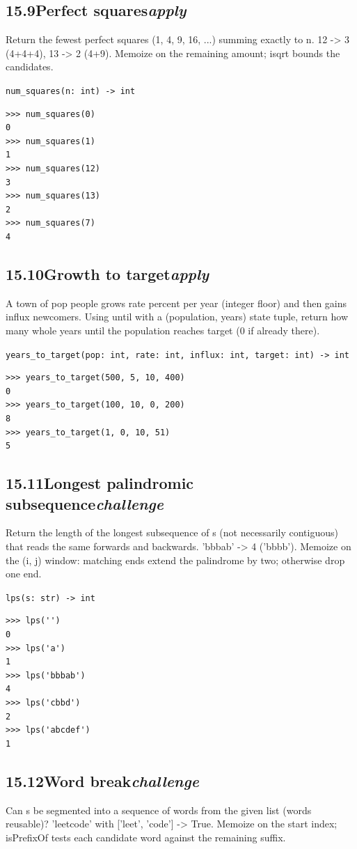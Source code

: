 \documentclass[10pt,letterpaper]{book}
\begin{document}
\subsection*{15.9\quad Perfect squares\hfill\textnormal{\textit{apply}}}
Return the fewest perfect squares (1, 4, 9, 16, ...) summing exactly to n. 12 -> 3 (4+4+4), 13 -> 2 (4+9). Memoize on the remaining amount; isqrt bounds the candidates.

\noindent\texttt{num\_squares(n: int) -> int}
\begin{lstlisting}[style=ex]
>>> num_squares(0)
0
>>> num_squares(1)
1
>>> num_squares(12)
3
>>> num_squares(13)
2
>>> num_squares(7)
4
\end{lstlisting}
\subsection*{15.10\quad Growth to target\hfill\textnormal{\textit{apply}}}
A town of pop people grows rate percent per year (integer floor) and then gains influx newcomers. Using until with a (population, years) state tuple, return how many whole years until the population reaches target (0 if already there).

\noindent\texttt{years\_to\_target(pop: int, rate: int, influx: int, target: int) -> int}
\begin{lstlisting}[style=ex]
>>> years_to_target(500, 5, 10, 400)
0
>>> years_to_target(100, 10, 0, 200)
8
>>> years_to_target(1, 0, 10, 51)
5
\end{lstlisting}
\subsection*{15.11\quad Longest palindromic subsequence\hfill\textnormal{\textit{challenge}}}
Return the length of the longest subsequence of s (not necessarily contiguous) that reads the same forwards and backwards. 'bbbab' -> 4 ('bbbb'). Memoize on the (i, j) window: matching ends extend the palindrome by two; otherwise drop one end.

\noindent\texttt{lps(s: str) -> int}
\begin{lstlisting}[style=ex]
>>> lps('')
0
>>> lps('a')
1
>>> lps('bbbab')
4
>>> lps('cbbd')
2
>>> lps('abcdef')
1
\end{lstlisting}
\subsection*{15.12\quad Word break\hfill\textnormal{\textit{challenge}}}
Can s be segmented into a sequence of words from the given list (words reusable)? 'leetcode' with ['leet', 'code'] -> True. Memoize on the start index; isPrefixOf tests each candidate word against the remaining suffix.
\end{document}
